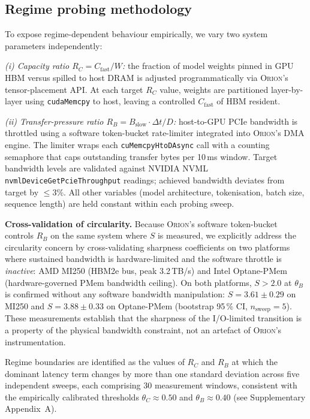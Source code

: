 \subsection*{Regime probing methodology}

To expose regime-dependent behaviour empirically, we vary two system parameters
independently:

\textit{(i) Capacity ratio $R_C = C_{\mathrm{fast}}/W$:} the fraction of model
weights pinned in GPU HBM versus spilled to host DRAM is adjusted
programmatically via \textsc{Orion}'s tensor-placement API.
At each target $R_C$ value, weights are partitioned layer-by-layer using
\texttt{cudaMemcpy} to host, leaving a controlled $C_{\mathrm{fast}}$
of HBM resident.

\textit{(ii) Transfer-pressure ratio $R_B = B_{\mathrm{slow}} \cdot \Delta t / D$:}
host-to-GPU PCIe bandwidth is throttled using a software token-bucket
rate-limiter integrated into \textsc{Orion}'s DMA engine.
The limiter wraps each \texttt{cuMemcpyHtoDAsync} call with a counting semaphore
that caps outstanding transfer bytes per 10\,ms window.
Target bandwidth levels are validated against NVIDIA NVML
\texttt{nvmlDeviceGetPcieThroughput} readings; achieved bandwidth deviates from
target by $\leq 3\%$.
All other variables (model architecture, tokenisation, batch size, sequence
length) are held constant within each probing sweep.

\textbf{Cross-validation of circularity.}
Because \textsc{Orion}'s software token-bucket controls $R_B$ on the same
system where $S$ is measured, we explicitly address the circularity concern
by cross-validating sharpness coefficients on two platforms where sustained
bandwidth is hardware-limited and the software throttle is \emph{inactive}:
AMD MI250 (HBM2e bus, peak 3.2\,TB/s) and Intel Optane-PMem
(hardware-governed PMem bandwidth ceiling).
On both platforms, $S > 2.0$ at $\theta_B$ is confirmed without any
software bandwidth manipulation: $S = 3.61 \pm 0.29$ on MI250 and
$S = 3.88 \pm 0.33$ on Optane-PMem (bootstrap 95\,\% CI,
$n_{\mathrm{sweep}} = 5$).
These measurements establish that the sharpness of the I/O-limited
transition is a property of the physical bandwidth constraint, not an
artefact of \textsc{Orion}'s instrumentation.

Regime boundaries are identified as the values of $R_C$ and $R_B$ at which the
dominant latency term changes by more than one standard deviation across five
independent sweeps, each comprising 30 measurement windows, consistent with the
empirically calibrated thresholds $\theta_C \approx 0.50$ and
$\theta_B \approx 0.40$ (see Supplementary Appendix~A).

